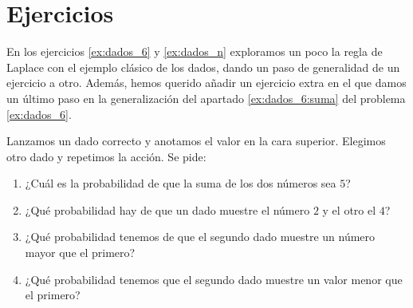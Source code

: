 \section{Ejercicios}

En los ejercicios \ref{ex:dados_6} y \ref{ex:dados_n} exploramos un poco la regla de Laplace con el ejemplo clásico de los dados, dando un paso de generalidad de un ejercicio a otro. Además, hemos querido añadir un ejercicio extra en el que damos un último paso en la generalización del apartado \ref{ex:dados_6:suma} del problema \ref{ex:dados_6}.

\setcounter{problem}{1}

\begin{exercise} \label{ex:dados_6}
  Lanzamos un dado correcto y anotamos el valor en la cara superior. Elegimos otro dado y repetimos la acción. Se pide:
  \begin{enumerate}
    \item ¿Cuál es la probabilidad de que la suma de los dos números sea $5$? \label{ex:dados_6:suma}
    \item ¿Qué probabilidad hay de que un dado muestre el número $2$ y el otro el $4$?
    \item ¿Qué probabilidad tenemos de que el segundo dado muestre un número mayor que el primero?
    \item ¿Qué probabilidad tenemos que el segundo dado muestre un valor menor que el primero?
  \end{enumerate}
\end{exercise}

